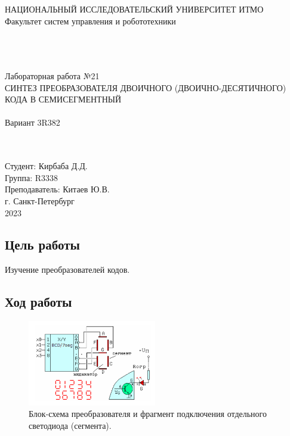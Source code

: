 \documentclass[12pt]{article}
\begin{document}
\begin{titlepage}
\begin{center}
    НАЦИОНАЛЬНЫЙ ИССЛЕДОВАТЕЛЬСКИЙ УНИВЕРСИТЕТ ИТМО \\
    Факультет систем управления и робототехники \\
    \vspace*{10\baselineskip}
    {} \\
    \ \\
    \ \\
    \begin{spacing}{1.5}
    {\large Лабораторная работа №21 \\
    СИНТЕЗ ПРЕОБРАЗОВАТЕЛЯ ДВОИЧНОГО (ДВОИЧНО-ДЕСЯТИЧНОГО) КОДА В СЕМИСЕГМЕНТНЫЙ \\
    \ \\
    Вариант 3R382}
    \end{spacing} \\
    \ \\
    \vspace*{10\baselineskip}
    \hfill {Студент: Кирбаба Д.Д.\ \ \ \ \ \ \ \ \ } \\
    \hfill {Группа: R3338\ \ \ \ \ \ \ \ \ \ \ \ \ \ \ \ \ \ \ \ \ } \\
    \hfill {Преподаватель: Китаев Ю.В.} \\
    \mbox{}
    \vfill {г. Санкт-Петербург\\2023}
\end{center}
\end{titlepage}

\subsection*{Цель работы}
Изучение преобразователей кодов.

\subsection*{Ход работы}

\begin{figure}[H]
    \centering
    \includegraphics[width=0.5\textwidth]{main_scheme.png}
    \caption{Блок-схема преобразователя и фрагмент подключения отдельного светодиода (сегмента).}
    \label{fig:main_scheme}
\end{figure}
\end{document}
